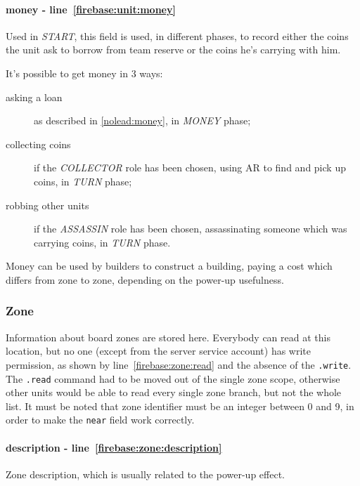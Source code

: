 				\paragraph{money - line~\ref{firebase:unit:money}}
				Used in \emph{START}, this field is used, in different phases, to record either the coins the unit ask to borrow from team reserve or the coins he's carrying with him.
				
				It's possible to get money in 3 ways:
				\begin{description}
					\item[asking a loan] as described in \autoref{nolead:money}, in \emph{MONEY} phase;
					\item[collecting coins] if the \emph{COLLECTOR} role has been chosen, using AR to find and pick up coins, in \emph{TURN} phase;
					\item[robbing other units] if the \emph{ASSASSIN} role has been chosen, assassinating someone which was carrying coins, in \emph{TURN} phase.
				\end{description}
			
				Money can be used by builders to construct a building, paying a cost which differs from zone to zone, depending on the power-up usefulness.
			
			\subsubsection{Zone}
			
				
								
				Information about board zones are stored here.
				Everybody can read at this location, but no one (except from the server service account) has write permission, as shown by line~\ref{firebase:zone:read} and the absence of the \lstinline|.write|.
				The \lstinline|.read| command had to be moved out of the single zone scope, otherwise other units would be able to read every single zone branch, but not the whole list.
				It must be noted that zone identifier must be an integer between 0 and 9, in order to make the \lstinline|near| field work correctly.
				
				\paragraph{description - line~\ref{firebase:zone:description}}
				Zone description, which is usually related to the power-up effect.
				
